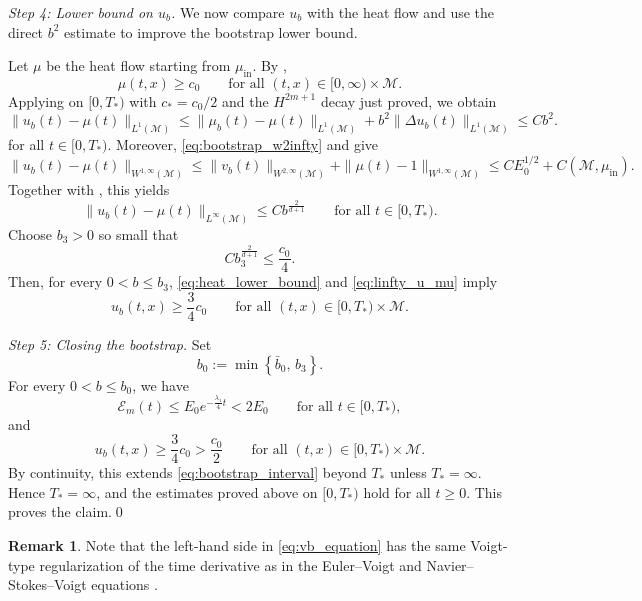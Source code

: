 \documentclass[11pt]{article}
\theoremstyle{definition}
\newtheorem{remark}[theorem]{Remark}
\def\M{\mathcal M}
\begin{document}
\medskip
\noindent\emph{Step 4: Lower bound on $u_b$.} We now compare $u_b$ with the heat flow and use the direct $b^2$ estimate to improve the bootstrap lower bound.

Let $\mu$ be the heat flow starting from $\mu_{\mathrm{in}}$. By ,
\begin{equation}\label{eq:heat_lower_bound}
\mu(t,x)\ge c_0
\qquad
\text{for all } (t,x)\in [0,\infty)\times  \M.
\end{equation}
Applying  on $[0,T_\ast)$ with $c_\ast=c_0/2$ and the
$H^{2m+1}$ decay just proved, we obtain
\begin{equation}\label{eq:l1_u_mu}
\|u_b(t)-\mu(t)\|_{L^1( \M)}
\le
\|\mu_b(t)-\mu(t)\|_{L^1( \M)}
+
b^2\|\Delta u_b(t)\|_{L^1( \M)}
\le
Cb^2.
\end{equation}
for all $t\in[0,T_\ast)$.
Moreover, \eqref{eq:bootstrap_w2infty} and  give
\[
\|u_b(t)-\mu(t)\|_{W^{1,\infty}( \M)}
\le
\|v_b(t)\|_{W^{2,\infty}( \M)}
+
\|\mu(t)-1\|_{W^{1,\infty}( \M)}
\le
CE_0^{1/2}+C( \M,\mu_{\mathrm{in}}).
\]
Together with , this yields
\begin{equation}\label{eq:linfty_u_mu}
\|u_b(t)-\mu(t)\|_{L^\infty( \M)}
\le
C b^{\frac{2}{ d+1}}
\qquad
\text{for all } t\in[0,T_\ast).
\end{equation}
Choose $b_3>0$ so small that
\[
C b_3^{\frac{2}{ d+1}} \le \frac{c_0}{4}.
\]
Then, for every $0<b\le b_3$, \eqref{eq:heat_lower_bound} and \eqref{eq:linfty_u_mu} imply
\[
u_b(t,x)\ge \frac{3}{4}c_0
\qquad
\text{for all } (t,x)\in[0,T_\ast)\times  \M.
\]

\medskip
\noindent\emph{Step 5: Closing the bootstrap.} Set
\[
b_0
:=
\min\left\{
\bar b_0,\,
b_3
\right\}.
\]
For every $0<b\le b_0$, we have
\[
\mathcal E_m(t)\le E_0 e^{-\frac{ \lambda_1}{4}t}<2E_0
\qquad\text{for all }t\in[0,T_\ast),
\]
and
\[
u_b(t,x)\ge \frac{3}{4}c_0>\frac{c_0}{2}
\qquad\text{for all }(t,x)\in[0,T_\ast)\times \M.
\]
By continuity, this extends \eqref{eq:bootstrap_interval} beyond $T_\ast$
unless $T_\ast=\infty$. Hence $T_\ast=\infty$, and the estimates proved above on
$[0,T_\ast)$ hold for all $t\ge0$. This proves the claim.\qed



\begin{remark}
    Note that the left-hand side in \eqref{eq:vb_equation} has the same Voigt-type regularization of the time derivative as in the Euler--Voigt and Navier--Stokes--Voigt equations \cite{larios2009higher}.
\end{remark}
\end{document}
